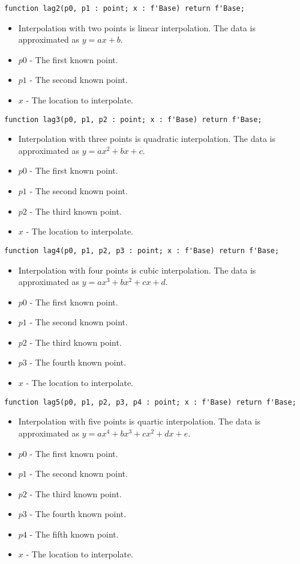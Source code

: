 \documentclass[10pt, openany]{book}
\begin{document}
\begin{lstlisting}
function lag2(p0, p1 : point; x : f'Base) return f'Base;
\end{lstlisting}
\begin{itemize}
  \item Interpolation with two points is linear interpolation.  The data is approximated as $y = ax+b$.
  \item $p0$ - The first known point.
  \item $p1$ - The second known point.
  \item $x$ - The location to interpolate.
\end{itemize}

\begin{lstlisting}
function lag3(p0, p1, p2 : point; x : f'Base) return f'Base;
\end{lstlisting}
\begin{itemize}
  \item Interpolation with three points is quadratic interpolation.  The data is approximated as $y = ax^2+bx+c$.
  \item $p0$ - The first known point.
  \item $p1$ - The second known point.
  \item $p2$ - The third known point.
  \item $x$ - The location to interpolate.
\end{itemize}

\begin{lstlisting}
function lag4(p0, p1, p2, p3 : point; x : f'Base) return f'Base;
\end{lstlisting}
\begin{itemize}
  \item Interpolation with four points is cubic interpolation.  The data is approximated as $y = ax^3+bx^2+cx+d$.
  \item $p0$ - The first known point.
  \item $p1$ - The second known point.
  \item $p2$ - The third known point.
  \item $p3$ - The fourth known point.
  \item $x$ - The location to interpolate.
\end{itemize}

\begin{lstlisting}
function lag5(p0, p1, p2, p3, p4 : point; x : f'Base) return f'Base;
\end{lstlisting}
\begin{itemize}
  \item Interpolation with five points is quartic interpolation.  The data is approximated as $y = ax^4+bx^3+cx^2+dx+e$.
  \item $p0$ - The first known point.
  \item $p1$ - The second known point.
  \item $p2$ - The third known point.
  \item $p3$ - The fourth known point.
  \item $p4$ - The fifth known point.
  \item $x$ - The location to interpolate.
\end{itemize}
\end{document}
